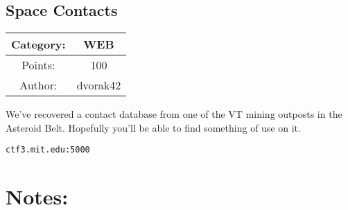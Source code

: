 \begin{center}
\section*{Space Contacts}
{\large
\begin{tabular}{| c c |}
\hline
Category: & WEB\\\hline
Points: & 100\\\hline
Author: & dvorak42\\\hline
\end{tabular}
}
\end{center}
\vspace{0.5in}

{\large
We've recovered a contact database from one of the VT mining outposts in the Asteroid Belt. Hopefully you'll be able to find something of use on it.
}
\vspace{0.25in}
\begin{center}
  {\Large\tt ctf3.mit.edu:5000}
\end{center}

\vspace{0.25in}
\section*{Notes:}
